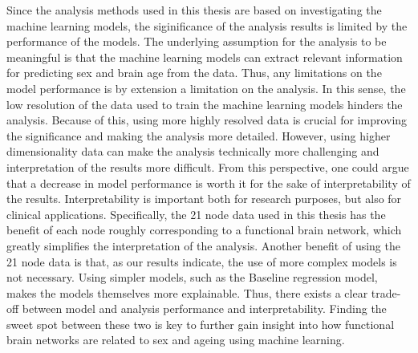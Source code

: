 



Since the analysis methods used in this thesis are based on investigating the machine learning models, the siginificance of the analysis results is limited by the performance of the models. The underlying assumption for the analysis to be meaningful is that the machine learning models can extract relevant information for predicting sex and brain age from the data. Thus, any limitations on the model performance is by extension a limitation on the analysis. In this sense, the low resolution of the data used to train the machine learning models hinders the analysis. Because of this, using more highly resolved data is crucial for improving the significance and making the analysis more detailed. However, using higher dimensionality data can make the analysis technically more challenging and interpretation of the results more difficult. From this perspective, one could argue that a decrease in model performance is worth it for the sake of interpretability of the results. Interpretability is important both for research purposes, but also for clinical applications. Specifically, the 21 node data used in this thesis has the benefit of each node roughly corresponding to a functional brain network, which greatly simplifies the interpretation of the analysis. Another benefit of using the 21 node data is that, as our results indicate, the use of more complex models is not necessary. Using simpler models, such as the Baseline regression model, makes the models themselves more explainable. Thus, there exists a clear trade-off between model and analysis performance and interpretability. Finding the sweet spot between these two is key to further gain insight into how functional brain networks are related to sex and ageing using machine learning. 



